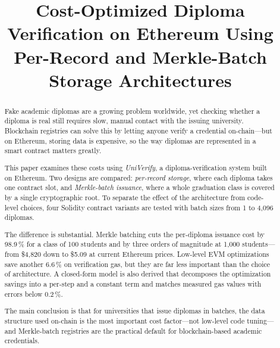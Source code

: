\documentclass[conference]{IEEEtran}
\begin{document}
\title{Cost-Optimized Diploma Verification on Ethereum Using Per-Record and Merkle-Batch Storage Architectures}

\author{
  \and
}

\maketitle

\begin{abstract}
Fake academic diplomas are a growing problem worldwide,
yet checking whether a diploma is real still requires
slow, manual contact with the issuing university.
Blockchain registries can solve this by letting anyone
verify a credential on-chain---but on Ethereum, storing
data is expensive, so the way diplomas are represented
in a smart contract matters greatly.

This paper examines these costs using \emph{UniVerify},
a diploma-verification system built on Ethereum.
Two designs are compared: \emph{per-record storage},
where each diploma takes one contract slot, and
\emph{Merkle-batch issuance}, where a whole graduation
class is covered by a single cryptographic root.
To separate the effect of the architecture from
code-level choices, four Solidity contract variants
are tested with batch sizes from 1 to 4{,}096 diplomas.

The difference is substantial.
Merkle batching cuts the per-diploma issuance cost by
98.9\,\% for a class of 100 students and by three orders
of magnitude at 1{,}000 students---from \$4{,}820 down
to \$5.09 at current Ethereum prices.
Low-level EVM optimizations save another 6.6\,\% on
verification gas, but they are far less important than
the choice of architecture.
A closed-form model is also derived that decomposes the
optimization savings into a per-step and a constant term
and matches measured gas values with errors below 0.2\,\%.

The main conclusion is that for universities that issue
diplomas in batches, the data structure used on-chain
is the most important cost factor---not low-level code
tuning---and Merkle-batch registries are the practical
default for blockchain-based academic credentials.
\end{abstract}
\end{document}
